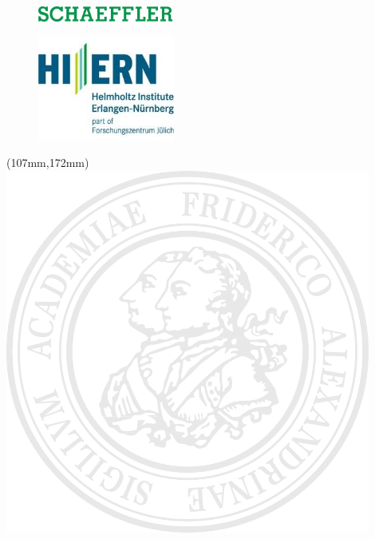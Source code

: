 
\begin{titlepage}

\centering
\begin{figure}[t]
    \begin{minipage}[]{0.49\textwidth}
        \flushleft
        \includegraphics[width=4.5cm]{images/essential/schaeffler.png}\\
    \end{minipage}
    \begin{minipage}[]{0.49\textwidth}
        \flushright
        \includegraphics[width=4.5cm]{images/essential/HIERN.jpg}\\
    \end{minipage}
\end{figure}

\begin{textblock*}{\textwidth}(107mm,172mm)
	\includegraphics[width=120mm]{images/essential/fausiegel.pdf}
\end{textblock*}


\end{titlepage}
